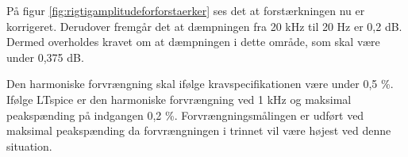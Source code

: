 På figur \ref{fig:rigtigamplitudeforforstaerker} ses det at forstærkningen nu er korrigeret. Derudover fremgår det at dæmpningen fra 20 kHz til 20 Hz er 0,2 dB. Dermed overholdes kravet om at dæmpningen i dette område, som skal være under 0,375 dB. 

Den harmoniske forvrængning skal ifølge kravspecifikationen være under 0,5 \%. Ifølge LTspice er den harmoniske forvrængning ved 1 kHz og maksimal peakspænding på indgangen 0,2 \%. Forvrængningsmålingen er udført ved maksimal peakspænding da forvrængningen i trinnet vil være højest ved denne situation. 






